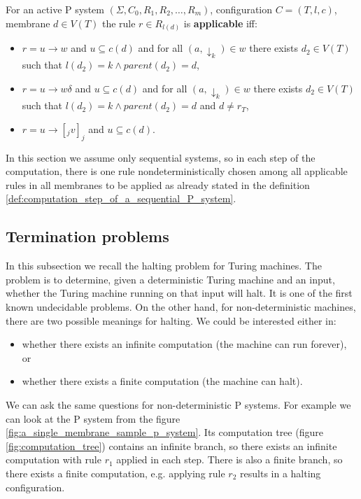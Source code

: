 \begin{definition}
  \label{def:applicable_rule_of_active_p_system}
  For an active P system $(\Sigma, C_0, R_1, R_2, \ldots, R_m)$, configuration $C = (T, l, c)$, membrane $d\in V(T)$ the rule $r\in R_{l(d)}$ is {\bf applicable} iff:
  \begin{itemize}
    \item $r = u\rightarrow w$ and $u\subseteq c(d)$ and for all $(a,\downarrow_k)\in w$ there exists $d_2\in V(T)$ such that $l(d_2)=k \wedge parent(d_2) = d$,
    \item $r = u\rightarrow w\delta$ and $u\subseteq c(d)$ and for all $(a,\downarrow_k)\in w$ there exists $d_2\in V(T)$ such that $l(d_2)=k \wedge parent(d_2) = d$ and $d\neq r_T$,
    \item $r = u\rightarrow [_j v]_j$ and $u\subseteq c(d)$.
  \end{itemize}
\end{definition}

In this section we assume only sequential systems, so in each step of the computation, there is one rule nondeterministically chosen among all applicable rules in all membranes to be applied as already stated in the definition \ref{def:computation_step_of_a_sequential_P_system}.


\subsection{Termination problems} %
\label{sub:termination_problems}

In this subsection we recall the halting problem for Turing machines. The problem is to determine, given a deterministic Turing machine and an input, whether the Turing machine running on that input will halt. It is one of the first known undecidable problems. On the other hand, for non-deterministic machines, there are two possible meanings for halting. We could be interested either in:
\begin{itemize}
  \item whether there exists an infinite computation (the machine can run forever), or
  \item whether there exists a finite computation (the machine can halt).
\end{itemize}

We can ask the same questions for non-deterministic P systems.
For example we can look at the P system from the figure \ref{fig:a_single_membrane_sample_p_system}. Its computation tree (figure \ref{fig:computation_tree}) contains an infinite branch, so there exists an infinite computation with rule $r_1$ applied in each step. There is also a finite branch, so there exists a finite computation, e.g. applying rule $r_2$ results in a halting configuration.

